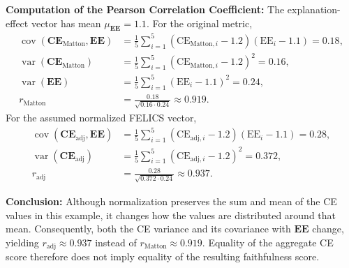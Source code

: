 \begin{example_box}[label=ex:payout_normalization_correlation]
    \smallskip
    \textbf{Computation of the Pearson Correlation Coefficient:} The explanation-effect vector has mean $\mu_{\mathbf{EE}}=1.1$. For the original metric,
    \begin{align}
        \operatorname{cov}(\mathbf{CE}_{\mathrm{Matton}}, \mathbf{EE}) & = \frac{1}{5}\sum_{i=1}^5 (\mathrm{CE}_{\mathrm{Matton},i} - 1.2)(\mathrm{EE}_i - 1.1) = 0.18, \\
        \operatorname{var}(\mathbf{CE}_{\mathrm{Matton}})              & = \frac{1}{5}\sum_{i=1}^5 (\mathrm{CE}_{\mathrm{Matton},i} - 1.2)^2 = 0.16, \\
        \operatorname{var}(\mathbf{EE})                                 & = \frac{1}{5}\sum_{i=1}^5 (\mathrm{EE}_i - 1.1)^2 = 0.24, \\
        r_{\mathrm{Matton}}                                  & = \frac{0.18}{\sqrt{0.16 \cdot 0.24}} \approx 0.919.
    \end{align}
    For the assumed normalized FELICS vector,
    \begin{align}
        \operatorname{cov}(\mathbf{CE}_{\mathrm{adj}}, \mathbf{EE}) & = \frac{1}{5}\sum_{i=1}^5 (\mathrm{CE}_{\mathrm{adj},i} - 1.2)(\mathrm{EE}_i - 1.1) = 0.28, \\
        \operatorname{var}(\mathbf{CE}_{\mathrm{adj}})              & = \frac{1}{5}\sum_{i=1}^5 (\mathrm{CE}_{\mathrm{adj},i} - 1.2)^2 = 0.372, \\
        r_{\mathrm{adj}}                                 & = \frac{0.28}{\sqrt{0.372 \cdot 0.24}} \approx 0.937.
    \end{align}

    \smallskip
    \textbf{Conclusion:} Although normalization preserves the sum and mean of the CE values in this example, it changes how the values are distributed around that mean. Consequently, both the CE variance and its covariance with $\mathbf{EE}$ change, yielding $r_{\mathrm{adj}}\approx0.937$ instead of $r_{\mathrm{Matton}}\approx0.919$. Equality of the aggregate CE score therefore does not imply equality of the resulting faithfulness score.
\end{example_box}

